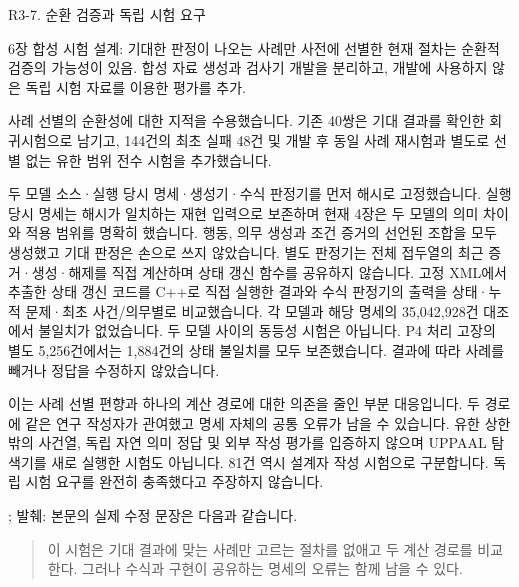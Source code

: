\clearpage

\begin{reviewitem}{R3-7. 순환 검증과 독립 시험 요구}

\begin{reviewercomment}

6장 합성 시험 설계: 기대한 판정이 나오는 사례만 사전에 선별한 현재 절차는 순환적 검증의 가능성이 있음. 합성 자료 생성과 검사기 개발을 분리하고, 개발에 사용하지 않은 독립 시험 자료를 이용한 평가를 추가.

\end{reviewercomment}

\begin{authorresponse}

사례 선별의 순환성에 대한 지적을 수용했습니다. 기존 40쌍은 기대 결과를 확인한 회귀시험으로 남기고, 144건의 최초 실패 48건 및 개발 후 동일 사례 재시험과 별도로 선별 없는 유한 범위 전수 시험을 추가했습니다.

두 모델 소스·실행 당시 명세·생성기·수식 판정기를 먼저 해시로 고정했습니다. 실행 당시 명세는 해시가 일치하는 재현 입력으로 보존하며 현재 4장은 두 모델의 의미 차이와 적용 범위를 명확히 했습니다. 행동, 의무 생성과 조건 증거의 선언된 조합을 모두 생성했고 기대 판정은 손으로 쓰지 않았습니다. 별도 판정기는 전체 접두열의 최근 증거·생성·해제를 직접 계산하며 상태 갱신 함수를 공유하지 않습니다. 고정 XML에서 추출한 상태 갱신 코드를 C++로 직접 실행한 결과와 수식 판정기의 출력을 상태·누적 문제·최초 사건/의무별로 비교했습니다. 각 모델과 해당 명세의 35,042,928건 대조에서 불일치가 없었습니다. 두 모델 사이의 동등성 시험은 아닙니다. P4 처리 고장의 별도 5,256건에서는 1,884건의 상태 불일치를 모두 보존했습니다. 결과에 따라 사례를 빼거나 정답을 수정하지 않았습니다.

이는 사례 선별 편향과 하나의 계산 경로에 대한 의존을 줄인 부분 대응입니다. 두 경로에 같은 연구 작성자가 관여했고 명세 자체의 공통 오류가 남을 수 있습니다. 유한 상한 밖의 사건열, 독립 자연 의미 정답 및 외부 작성 평가를 입증하지 않으며 UPPAAL 탐색기를 새로 실행한 시험도 아닙니다. 81건 역시 설계자 작성 시험으로 구분합니다. 독립 시험 요구를 완전히 충족했다고 주장하지 않습니다.

\end{authorresponse}

\begin{manuscriptrevision}{; 발췌: }
본문의 실제 수정 문장은 다음과 같습니다.

\begin{quote}
이 시험은 기대 결과에 맞는 사례만 고르는 절차를 없애고 두 계산 경로를 비교한다. 그러나 수식과 구현이 공유하는 명세의 오류는 함께 남을 수 있다.
\end{quote}
\end{manuscriptrevision}

\end{reviewitem}

